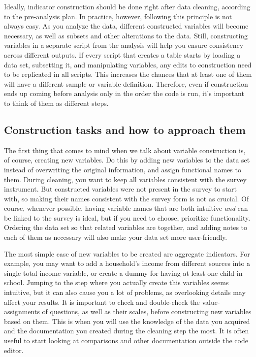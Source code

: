 Ideally, indicator construction should be done right after data cleaning, 
according to the pre-analysis plan.
In practice, however, following this principle is not always easy.
As you analyze the data, different constructed variables will become necessary, 
as well as subsets and other alterations to the data.
Still, constructing variables in a separate script from the analysis 
will help you ensure consistency across different outputs. 
If every script that creates a table starts by loading a data set, 
subsetting it, and manipulating variables, 
any edits to construction need to be replicated in all scripts. 
This increases the chances that at least one of them will have a different sample or variable definition.
Therefore, even if construction ends up coming before analysis only in the order the code is run,
it's important to think of them as different steps.

\subsection{Construction tasks and how to approach them}

The first thing that comes to mind when we talk about variable construction is, of course, creating new variables.
Do this by adding new variables to the data set instead of overwriting the original information, 
and assign functional names to them.
During cleaning, you want to keep all variables consistent with the survey instrument.
But constructed variables were not present in the survey to start with,
so making their names consistent with the survey form is not as crucial.
Of course, whenever possible, having variable names that are both intuitive 
\textit{and} can be linked to the survey is ideal, 
but if you need to choose, prioritize functionality.
Ordering the data set so that related variables are together, 
and adding notes to each of them as necessary will also make your data set more user-friendly.

The most simple case of new variables to be created are aggregate indicators. 
For example, you may want to add a household's income from different sources into a single total income variable, 
or create a dummy for having at least one child in school.
Jumping to the step where you actually create this variables seems intuitive,
but it can also cause you a lot of problems, 
as overlooking details may affect your results.
It is important to check and double-check the value-assignments of questions,
as well as their scales, before constructing new variables based on them.
This is when you will use the knowledge of the data you acquired and the documentation you created during the cleaning step the most.
It is often useful to start looking at comparisons and other documentation outside the code editor.

